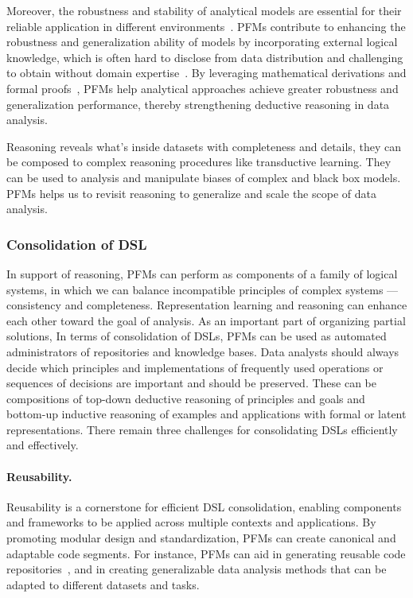 Moreover, the robustness and stability of analytical models are essential for their reliable application in different environments~\cite{029dietterich1995overfitting}. PFMs contribute to enhancing the robustness and generalization ability of models by incorporating external logical knowledge, which is often hard to disclose from data distribution and challenging to obtain without domain expertise~\cite{031guyon2003introduction}. By leveraging mathematical derivations and formal proofs~\cite{wang2023large}, PFMs help analytical approaches achieve greater robustness and generalization performance, thereby strengthening deductive reasoning in data analysis.

Reasoning reveals what's inside datasets with completeness and details, they can be composed to complex reasoning procedures like transductive learning. They can be used to analysis and manipulate biases of complex and black box models. PFMs helps us to revisit reasoning to generalize and scale the scope of data analysis.

\subsubsection{Consolidation of DSL}\label{sec:consolidate_dsl}

In support of reasoning, PFMs can perform as components of a family of logical systems, in which we can balance incompatible principles of complex systems — consistency and completeness. Representation learning and reasoning can enhance each other toward the goal of analysis. As an important part of organizing partial solutions, In terms of consolidation of DSLs, PFMs can be used as automated administrators of repositories and knowledge bases. Data analysts should always decide which principles and implementations of frequently used operations or sequences of decisions are important and should be preserved. These can be compositions of top-down deductive reasoning of principles and goals and bottom-up inductive reasoning of examples and applications with formal or latent representations. There remain three challenges for consolidating DSLs efficiently and effectively.

\paragraph{Reusability.} Reusability is a cornerstone for efficient DSL consolidation, enabling components and frameworks to be applied across multiple contexts and applications. By promoting modular design and standardization, PFMs can create canonical and adaptable code segments. For instance, PFMs can aid in generating reusable code repositories~\cite{jain2024r2e, repocomp}, and in creating generalizable data analysis methods that can be adapted to different datasets and tasks.

